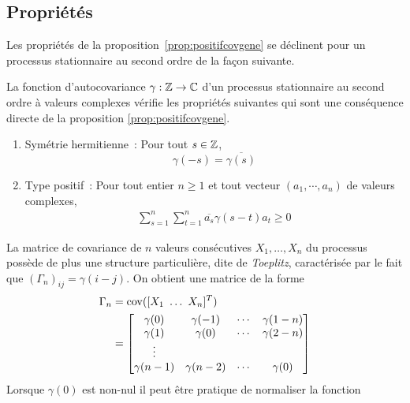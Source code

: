 \subsection{Propri\'et\'es}
Les propri\'et\'es de la proposition~\ref{prop:positifcovgene} se d\'eclinent pour un
processus stationnaire au second ordre de la fa\c{c}on suivante.
\begin{proposition}
 \label{prop:stat2}
 La fonction d'autocovariance $\gamma: \mathbb{Z} \rightarrow \mathbb{C}$ d'un processus
 stationnaire au second ordre \`a valeurs complexes v\'erifie les propri\'et\'es
 suivantes qui sont une cons\'equence directe de la proposition
 \ref{prop:positifcovgene}.
\begin{enumerate}
\item Sym\'etrie hermitienne~:  Pour tout $s\in\mathbb{Z}$,
\[
\gamma(-s)= \overline{\gamma(s)}
\]
\item\label{item:type_positif} Type positif~:  Pour tout entier $n\geq1$ et tout
  vecteur $(a_1, \cdots, a_n)$ de valeurs complexes,
\begin{eqnarray*}
   \sum_{s=1}^{n}\sum_{t=1}^{n}
\overline{a_s} \gamma(s-t) a_t \geq 0
\end{eqnarray*}
\end{enumerate}
\end{proposition}
La matrice de covariance de $n$ valeurs cons\'ecutives $X_1,\dots,X_n$ du
processus poss\`ede de plus une structure particuli\`ere, dite de \emph{Toeplitz},
caract\'eris\'ee par le fait que $(\Gamma_n)_{ij} = \gamma(i-j)$.  On obtient une
matrice de la forme
 \begin{align}
 \Gamma_n \nonumber
      &=\mathrm{cov}([X_1\,\,\dots\,\, X_n]^T) \\
      &=
     \left [
     \begin{matrix}
      \gamma(0)&\gamma(-1)&\cdots&\gamma(1-n)\\
      \gamma(1)&\gamma(0)&\cdots&\gamma(2-n)\\
        \vdots\\
      \gamma(n-1)&\gamma(n-2)&\cdots&\gamma(0)
     \end{matrix}
     \right ]
 \label{eq:matcov}
\end{align}
Lorsque $\gamma(0)$ est non-nul il peut \^{e}tre pratique de normaliser la fonction
